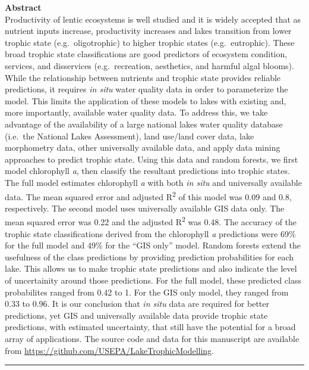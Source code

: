 \documentclass[12pt,]{article}
\begin{document}
\textbf{Abstract}\\Productivity of lentic ecosystems is well studied and
it is widely accepted that as nutrient inputs increase, productivity
increases and lakes transition from lower trophic state
(e.g.~oligotrophic) to higher trophic states (e.g.~eutrophic). These
broad trophic state classifications are good predictors of ecosystem
condition, services, and disservices (e.g.~recreation, aesthetics, and
harmful algal blooms). While the relationship between nutrients and
trophic state provides reliable predictions, it requires \emph{in situ}
water quality data in order to parameterize the model. This limits the
application of these models to lakes with existing and, more
importantly, available water quality data. To address this, we take
advantage of the availability of a large national lakes water quality
database (i.e.~the National Lakes Assessment), land use/land cover data,
lake morphometry data, other universally available data, and apply data
mining approaches to predict trophic state. Using this data and random
forests, we first model chlorophyll \emph{a}, then classify the
resultant predictions into trophic states. The full model estimates
chlorophyll \emph{a} with both \emph{in situ} and universally available
data. The mean squared error and adjusted R\textsuperscript{2} of this
model was 0.09 and 0.8, respectively. The second model uses universally
available GIS data only. The mean squared error was 0.22 and the
adjusted R\textsuperscript{2} was 0.48. The accuracy of the trophic
state classifications derived from the chlorophyll \emph{a} predictions
were 69\% for the full model and 49\% for the ``GIS only'' model. Random
forests extend the usefulness of the class predictions by providing
prediction probabilities for each lake. This allows us to make trophic
state predictions and also indicate the level of uncertainity around
those predictions. For the full model, these predicted class
probabilites ranged from 0.42 to 1. For the GIS only model, they ranged
from 0.33 to 0.96. It is our conclusion that \emph{in situ} data are
required for better predictions, yet GIS and universally available data
provide trophic state predictions, with estimated uncertainty, that
still have the potential for a broad array of applications. The source
code and data for this manuscript are available from
\url{https://github.com/USEPA/LakeTrophicModelling}.

\vspace{3mm}

\hrule
\end{document}
